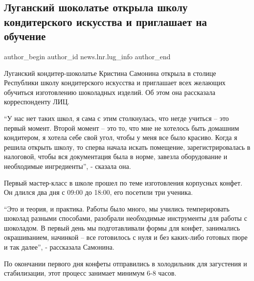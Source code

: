  
 
 
 
 
 
\subsection{Луганский шоколатье открыла школу кондитерского искусства и приглашает на обучение}
\label{sec:27_01_2022.stz.news.lnr.lug_info.2.shokolatje_lugansk}
 
\ifcmt
 author_begin
   author_id news.lnr.lug_info
 author_end
\fi

Луганский кондитер-шоколатье Кристина Самонина открыла в столице Республики
школу кондитерского искусства и приглашает всех желающих обучиться изготовлению
шоколадных изделий. Об этом она рассказала корреспонденту ЛИЦ.

\enquote{У нас нет таких школ, я сама с этим столкнулась, что негде учиться – это
первый момент. Второй момент – это то, что мне не хотелось быть домашним
кондитером, я хотела себе свой угол, чтобы у меня все было красиво. Когда я
решила открыть школу, то сперва начала искать помещение, зарегистрировалась в
налоговой, чтобы вся документация была в норме, завезла оборудование и
необходимые ингредиенты}, - сказала она.

Первый мастер-класс в школе прошел по теме изготовления корпусных конфет. Он
длился два дня с 09:00 до 18:00, его посетили три ученика.

\enquote{Это и теория, и практика. Работы было много, мы учились темперировать шоколад
разными способами, разобрали необходимые инструменты для работы с шоколадом. В
первый день мы подготавливали формы для конфет, занимались окрашиванием,
начинкой – все готовилось с нуля и без каких-либо готовых пюре и так далее}, -
рассказала Самонина.

По окончании первого дня конфеты отправились в холодильник для загустения и
стабилизации, этот процесс занимает минимум 6-8 часов.

